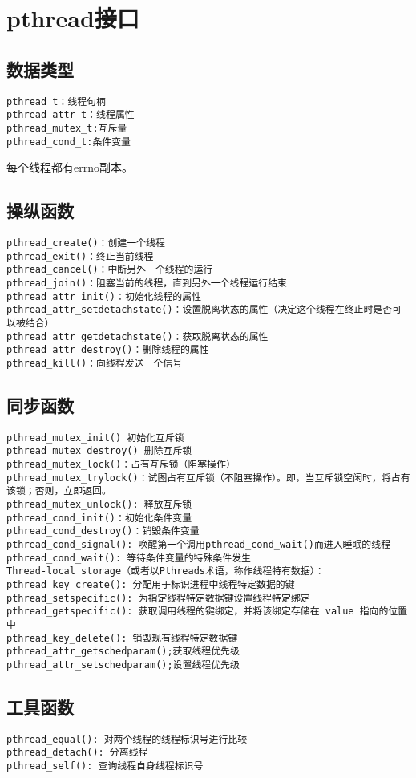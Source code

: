 \section{pthread接口}

\subsection{数据类型}
\begin{verbatim}
pthread_t：线程句柄
pthread_attr_t：线程属性
pthread_mutex_t:互斥量
pthread_cond_t:条件变量
\end{verbatim}
每个线程都有errno副本。

\subsection{操纵函数}
\begin{verbatim}
pthread_create()：创建一个线程
pthread_exit()：终止当前线程
pthread_cancel()：中断另外一个线程的运行
pthread_join()：阻塞当前的线程，直到另外一个线程运行结束
pthread_attr_init()：初始化线程的属性
pthread_attr_setdetachstate()：设置脱离状态的属性（决定这个线程在终止时是否可以被结合）
pthread_attr_getdetachstate()：获取脱离状态的属性
pthread_attr_destroy()：删除线程的属性
pthread_kill()：向线程发送一个信号
\end{verbatim}


\subsection{同步函数}
\begin{verbatim}
pthread_mutex_init() 初始化互斥锁
pthread_mutex_destroy() 删除互斥锁
pthread_mutex_lock()：占有互斥锁（阻塞操作）
pthread_mutex_trylock()：试图占有互斥锁（不阻塞操作）。即，当互斥锁空闲时，将占有该锁；否则，立即返回。
pthread_mutex_unlock(): 释放互斥锁
pthread_cond_init()：初始化条件变量
pthread_cond_destroy()：销毁条件变量
pthread_cond_signal(): 唤醒第一个调用pthread_cond_wait()而进入睡眠的线程
pthread_cond_wait(): 等待条件变量的特殊条件发生
Thread-local storage（或者以Pthreads术语，称作线程特有数据）：
pthread_key_create(): 分配用于标识进程中线程特定数据的键
pthread_setspecific(): 为指定线程特定数据键设置线程特定绑定
pthread_getspecific(): 获取调用线程的键绑定，并将该绑定存储在 value 指向的位置中
pthread_key_delete(): 销毁现有线程特定数据键
pthread_attr_getschedparam();获取线程优先级
pthread_attr_setschedparam();设置线程优先级
\end{verbatim}

\subsection{工具函数}
\begin{verbatim}
pthread_equal(): 对两个线程的线程标识号进行比较
pthread_detach(): 分离线程
pthread_self(): 查询线程自身线程标识号
\end{verbatim}









